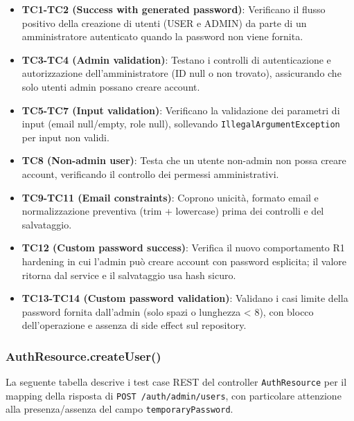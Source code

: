 ﻿\documentclass[11pt,a4paper]{article}
\begin{document}
\begin{itemize}
    \item \textbf{TC1-TC2 (Success with generated password)}: Verificano il flusso positivo della creazione di utenti (USER e ADMIN) da parte di un amministratore autenticato quando la password non viene fornita.
    
    \item \textbf{TC3-TC4 (Admin validation)}: Testano i controlli di autenticazione e autorizzazione dell'amministratore (ID null o non trovato), assicurando che solo utenti admin possano creare account.
    
    \item \textbf{TC5-TC7 (Input validation)}: Verificano la validazione dei parametri di input (email null/empty, role null), sollevando \texttt{IllegalArgumentException} per input non validi.
    
    \item \textbf{TC8 (Non-admin user)}: Testa che un utente non-admin non possa creare account, verificando il controllo dei permessi amministrativi.
    
    \item \textbf{TC9-TC11 (Email constraints)}: Coprono unicit\`a, formato email e normalizzazione preventiva (trim + lowercase) prima dei controlli e del salvataggio.

    \item \textbf{TC12 (Custom password success)}: Verifica il nuovo comportamento R1 hardening in cui l'admin pu\`o creare account con password esplicita; il valore ritorna dal service e il salvataggio usa hash sicuro.

    \item \textbf{TC13-TC14 (Custom password validation)}: Validano i casi limite della password fornita dall'admin (solo spazi o lunghezza < 8), con blocco dell'operazione e assenza di side effect sul repository.
\end{itemize}

\subsubsection{AuthResource.createUser()}

La seguente tabella descrive i test case REST del controller \texttt{AuthResource} per il mapping della risposta di \texttt{POST /auth/admin/users}, con particolare attenzione alla presenza/assenza del campo \texttt{temporaryPassword}.\\
\end{document}
